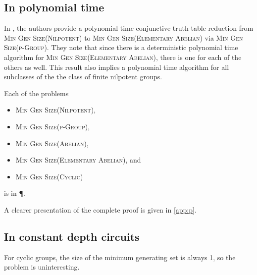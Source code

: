 \documentclass{article}
\begin{document}

\subsection{In polynomial time}

In \cite{at06}, the authors provide a polynomial time conjunctive truth-table reduction from \textsc{Min Gen Size(Nilpotent)} to \textsc{Min Gen Size(Elementary Abelian)} via \textsc{Min Gen Size(p-Group)}.
They note that since there is a deterministic polynomial time algorithm for \textsc{Min Gen Size(Elementary Abelian)}, there is one for each of the others as well.
This result also implies a polynomial time algorithm for all subclasses of the the class of finite nilpotent groups.

\begin{theorem}[{\cite[Theorem~7]{at06}}]
  Each of the problems
  \begin{itemize}
  \item \textsc{Min Gen Size(Nilpotent)},
  \item \textsc{Min Gen Size(p-Group)},
  \item \textsc{Min Gen Size(Abelian)},
  \item \textsc{Min Gen Size(Elementary Abelian)}, and
  \item \textsc{Min Gen Size(Cyclic)}
  \end{itemize}
  is in \P.
\end{theorem}

A clearer presentation of the complete proof is given in \autoref{app:p}.

\subsection{In constant depth circuits}

For cyclic groups, the size of the minimum generating set is always 1, so the problem is uninteresting.
\end{document}
